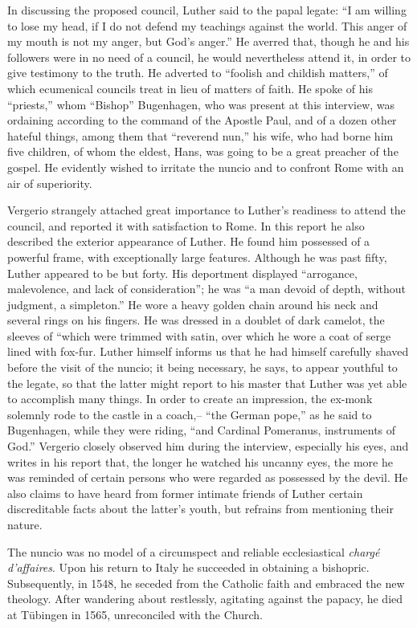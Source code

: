 In discussing the proposed council, Luther said to the papal legate: “I am
willing to lose my head, if I do not defend my teachings against the world.
This anger of my mouth is not my anger, but God’s anger.” He averred
that, though he and his followers were in no need of a council, he would
nevertheless attend it, in order to give testimony to the truth. He adverted
to “foolish and childish matters,” of which ecumenical councils treat in lieu
of matters of faith. He spoke of his “priests,” whom “Bishop” Bugenhagen,
who was present at this interview, was ordaining according to the command
of the Apostle Paul, and of a dozen other hateful things, among them that
“reverend nun,” his wife, who had borne him five children, of whom the
eldest, Hans, was going to be a great preacher of the gospel. He evidently
wished to irritate the nuncio and to confront Rome with an air of superiority.

Vergerio strangely attached great importance to Luther’s readiness to
attend the council, and reported it with satisfaction to Rome. In this report
he also described the exterior appearance of Luther. He found him possessed
of a powerful frame, with exceptionally large features. Although he was past
fifty, Luther appeared to be but forty. His deportment displayed “arrogance,
malevolence, and lack of consideration”; he was “a man devoid of depth,
without judgment, a simpleton.” He wore a heavy golden chain around his
neck and several rings on his fingers. He was dressed in a doublet of dark
camelot, the sleeves of “which were trimmed with satin, over which he wore
a coat of serge lined with fox-fur. Luther himself informs us that he had
himself carefully shaved before the visit of the nuncio; it being necessary,
he says, to appear youthful to the legate, so that the latter might report to
his master that Luther was yet able to accomplish many things. In order to
create an impression, the ex-monk solemnly rode to the castle in a coach,--
“the German pope,” as he said to Bugenhagen, while they were riding, “and
Cardinal Pomeranus, instruments of God.” Vergerio closely observed him
during the interview, especially his eyes, and writes in his report that, the
longer he watched his uncanny eyes, the more he was reminded of certain
persons who were regarded as possessed by the devil. He also claims to have
heard from former intimate friends of Luther certain discreditable facts
about the latter’s youth, but refrains from mentioning their nature.

The nuncio was no model of a circumspect and reliable ecclesiastical
\textit{chargé d’affaires}. Upon his return to Italy he succeeded in obtaining
a bishopric. Subsequently, in 1548, he seceded from the
Catholic faith and embraced the new theology. After wandering
about restlessly, agitating against the papacy, he died at Tübingen
in 1565, unreconciled with the Church.

